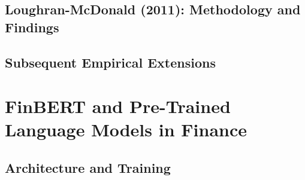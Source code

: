\documentclass[12pt,a4paper,oneside]{report}
\begin{document}
\subsection{Loughran-McDonald (2011): Methodology and Findings}
\label{sec:lm2011_review}

\subsection{Subsequent Empirical Extensions}
\label{sec:subsequent_extensions}

\section{FinBERT and Pre-Trained Language Models in Finance}
\label{sec:finbert_lit}

\subsection{Architecture and Training}
\label{sec:finbert_architecture}
\end{document}
